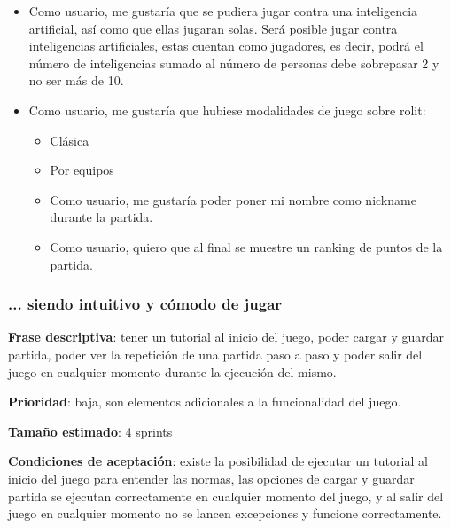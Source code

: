 \documentclass[../../SCRUM.tex]{subfiles}
\begin{document}
\begin{itemize}
\item  Como usuario, me gustaría que se pudiera jugar contra una inteligencia artificial, así como que ellas jugaran solas. 
    Será posible jugar contra inteligencias artificiales, estas cuentan como jugadores, es decir, podrá el número de inteligencias sumado al número de personas debe sobrepasar 2 y no ser más de 10.

\item Como usuario, me gustaría que hubiese modalidades de juego sobre rolit:
\begin{itemize}
	\item  Clásica 
     \item  Por equipos 
     \item Como usuario, me gustaría poder poner mi nombre como nickname durante la partida.
     \item Como usuario, quiero que al final se muestre un ranking de puntos de la partida.
\end{itemize}
\end{itemize}


\subsubsection{... siendo intuitivo y cómodo de jugar}
\textbf{Frase descriptiva}: tener un tutorial al inicio del juego, poder cargar y guardar partida, poder ver la repetición de una partida paso a paso y poder salir del juego en cualquier momento durante la ejecución del mismo.

\textbf{Prioridad}: baja, son elementos adicionales a la funcionalidad del juego.

\textbf{Tamaño estimado}: 4 sprints

\textbf{Condiciones de aceptación}: existe la posibilidad de ejecutar un tutorial al inicio del juego para entender las normas, las opciones de cargar y guardar partida se ejecutan correctamente en cualquier momento del juego, y al salir del juego en cualquier momento no se lancen excepciones y funcione correctamente.
\end{document}
